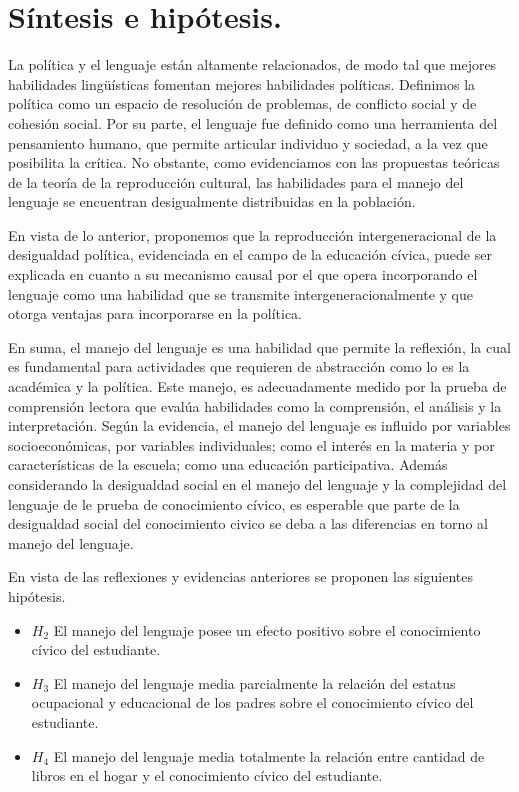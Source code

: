 \documentclass[12pt,twoside]{templates/facsothesis}
\providecommand{\tightlist}{%
  \setlength{\itemsep}{0pt}\setlength{\parskip}{0pt}}
\begin{document}
\hypertarget{suxedntesis-e-hipuxf3tesis.}{%
\section{Síntesis e hipótesis.}\label{suxedntesis-e-hipuxf3tesis.}}

La política y el lenguaje están altamente relacionados, de modo tal que mejores habilidades lingüísticas fomentan mejores habilidades políticas. Definimos la política como un espacio de resolución de problemas, de conflicto social y de cohesión social. Por su parte, el lenguaje fue definido como una herramienta del pensamiento humano, que permite articular individuo y sociedad, a la vez que posibilita la crítica. No obstante, como evidenciamos con las propuestas teóricas de la teoría de la reproducción cultural, las habilidades para el manejo del lenguaje se encuentran desigualmente distribuidas en la población.

En vista de lo anterior, proponemos que la reproducción intergeneracional de la desigualdad política, evidenciada en el campo de la educación cívica, puede ser explicada en cuanto a su mecanismo causal por el que opera incorporando el lenguaje como una habilidad que se transmite intergeneracionalmente y que otorga ventajas para incorporarse en la política.

En suma, el manejo del lenguaje es una habilidad que permite la reflexión, la cual es fundamental para actividades que requieren de abstracción como lo es la académica y la política. Este manejo, es adecuadamente medido por la prueba de comprensión lectora que evalúa habilidades como la comprensión, el análisis y la interpretación. Según la evidencia, el manejo del lenguaje es influido por variables socioeconómicas, por variables individuales; como el interés en la materia y por características de la escuela; como una educación participativa. Además considerando la desigualdad social en el manejo del lenguaje y la complejidad del lenguaje de le prueba de conocimiento cívico, es esperable que parte de la desigualdad social del conocimiento civico se deba a las diferencias en torno al manejo del lenguaje.

En vista de las reflexiones y evidencias anteriores se proponen las siguientes hipótesis.

\begin{itemize}
\tightlist
\item
  \(H_2\) El manejo del lenguaje posee un efecto positivo sobre el conocimiento cívico del estudiante.
\item
  \(H_3\) El manejo del lenguaje media parcialmente la relación del estatus ocupacional y educacional de los padres sobre el conocimiento cívico del estudiante.
\item
  \(H_4\) El manejo del lenguaje media totalmente la relación entre cantidad de libros en el hogar y el conocimiento cívico del estudiante.
\end{itemize}
\end{document}
